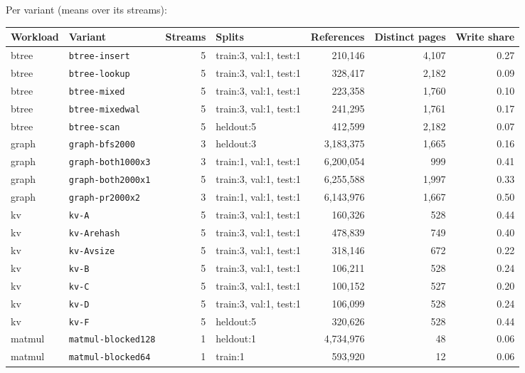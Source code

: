 \documentclass[10pt,a4paper]{article}
\newcommand{\code}[1]{\texttt{#1}}
\begin{document}
Per variant (means over its streams):

\begin{center}\footnotesize
\begin{adjustbox}{max width=\linewidth}
\begin{tabular}{llrlrrr}
\toprule
\textbf{Workload} & \textbf{Variant} & \textbf{Streams} & \textbf{Splits} & \textbf{References} & \textbf{Distinct pages} & \textbf{Write share} \\ \midrule
btree & \code{btree-insert} & 5 & train:3, val:1, test:1 & 210,146 & 4,107 & 0.27 \\
btree & \code{btree-lookup} & 5 & train:3, val:1, test:1 & 328,417 & 2,182 & 0.09 \\
btree & \code{btree-mixed} & 5 & train:3, val:1, test:1 & 223,358 & 1,760 & 0.10 \\
btree & \code{btree-mixedwal} & 5 & train:3, val:1, test:1 & 241,295 & 1,761 & 0.17 \\
btree & \code{btree-scan} & 5 & heldout:5 & 412,599 & 2,182 & 0.07 \\
graph & \code{graph-bfs2000} & 3 & heldout:3 & 3,183,375 & 1,665 & 0.16 \\
graph & \code{graph-both1000x3} & 3 & train:1, val:1, test:1 & 6,200,054 & 999 & 0.41 \\
graph & \code{graph-both2000x1} & 5 & train:3, val:1, test:1 & 6,255,588 & 1,997 & 0.33 \\
graph & \code{graph-pr2000x2} & 3 & train:1, val:1, test:1 & 6,143,976 & 1,667 & 0.50 \\
kv & \code{kv-A} & 5 & train:3, val:1, test:1 & 160,326 & 528 & 0.44 \\
kv & \code{kv-Arehash} & 5 & train:3, val:1, test:1 & 478,839 & 749 & 0.40 \\
kv & \code{kv-Avsize} & 5 & train:3, val:1, test:1 & 318,146 & 672 & 0.22 \\
kv & \code{kv-B} & 5 & train:3, val:1, test:1 & 106,211 & 528 & 0.24 \\
kv & \code{kv-C} & 5 & train:3, val:1, test:1 & 100,152 & 527 & 0.20 \\
kv & \code{kv-D} & 5 & train:3, val:1, test:1 & 106,099 & 528 & 0.24 \\
kv & \code{kv-F} & 5 & heldout:5 & 320,626 & 528 & 0.44 \\
matmul & \code{matmul-blocked128} & 1 & heldout:1 & 4,734,976 & 48 & 0.06 \\
matmul & \code{matmul-blocked64} & 1 & train:1 & 593,920 & 12 & 0.06 \\

\end{tabular}
\end{adjustbox}
\end{center}
\end{document}

